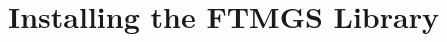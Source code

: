 \documentclass[a4paper]{article}
\begin{document}

\section{Installing the FTMGS Library}
\end{document}
